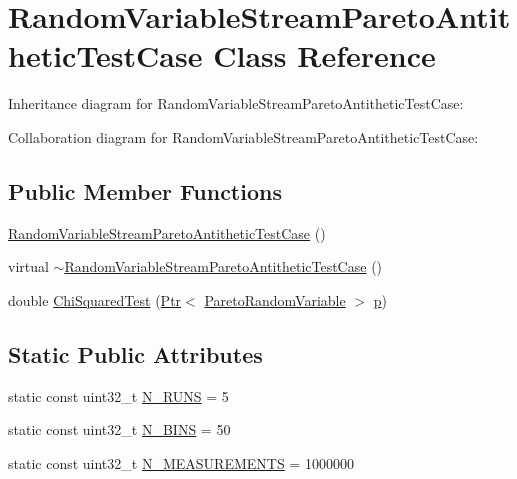 \hypertarget{classRandomVariableStreamParetoAntitheticTestCase}{}\section{Random\+Variable\+Stream\+Pareto\+Antithetic\+Test\+Case Class Reference}
\label{classRandomVariableStreamParetoAntitheticTestCase}


Inheritance diagram for Random\+Variable\+Stream\+Pareto\+Antithetic\+Test\+Case\+:


Collaboration diagram for Random\+Variable\+Stream\+Pareto\+Antithetic\+Test\+Case\+:
\subsection*{Public Member Functions}
\begin{DoxyCompactItemize}
\item 
\hyperlink{classRandomVariableStreamParetoAntitheticTestCase_abaef699ab97c8a0290f4304ae0581121}{Random\+Variable\+Stream\+Pareto\+Antithetic\+Test\+Case} ()
\item 
virtual \hyperlink{classRandomVariableStreamParetoAntitheticTestCase_a9b5ec7495d28f4e33f5a2e250ecf3759}{$\sim$\+Random\+Variable\+Stream\+Pareto\+Antithetic\+Test\+Case} ()
\item 
double \hyperlink{classRandomVariableStreamParetoAntitheticTestCase_a0c70901f3726165fa90c4500944fcfe2}{Chi\+Squared\+Test} (\hyperlink{classns3_1_1Ptr}{Ptr}$<$ \hyperlink{classns3_1_1ParetoRandomVariable}{Pareto\+Random\+Variable} $>$ \hyperlink{lte__link__budget__x2__handover__measures_8m_ac9de518908a968428863f829398a4e62}{p})
\end{DoxyCompactItemize}
\subsection*{Static Public Attributes}
\begin{DoxyCompactItemize}
\item 
static const uint32\+\_\+t \hyperlink{classRandomVariableStreamParetoAntitheticTestCase_ae520f9d14ad8332064076ecaeb87f64a}{N\+\_\+\+R\+U\+NS} = 5
\item 
static const uint32\+\_\+t \hyperlink{classRandomVariableStreamParetoAntitheticTestCase_a558fbee3cdd5c8a42c37f41b0df83b45}{N\+\_\+\+B\+I\+NS} = 50
\item 
static const uint32\+\_\+t \hyperlink{classRandomVariableStreamParetoAntitheticTestCase_a776b9649927ade74453b83dd35e0a43e}{N\+\_\+\+M\+E\+A\+S\+U\+R\+E\+M\+E\+N\+TS} = 1000000
\end{DoxyCompactItemize}
